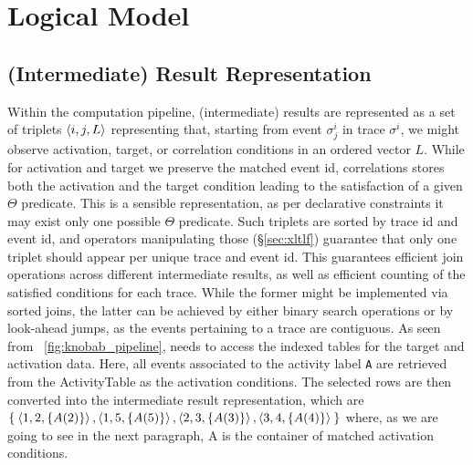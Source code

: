 \section{Logical Model}

\subsection{(Intermediate) Result Representation}
Within the computation pipeline, (intermediate) results are represented as a set of triplets $\braket{i,j,L}$ representing that, starting from event $\sigma^i_j$ in trace $\sigma^i$, we might observe activation, target, or correlation conditions in an ordered vector $L$.  While for activation and target %
we %
preserve 
the matched event id,
correlations stores
both the activation and the target condition leading to the satisfaction of a given $\Theta$ predicate. This is a sensible representation, as per declarative constraints it may exist only one possible $\Theta$ predicate. Such triplets are sorted by trace id and event id, and operators manipulating those (\S\ref{sec:xltlf}) guarantee that only one triplet should appear per unique trace and event id. This guarantees efficient join operations across different intermediate results, as well as efficient counting of the satisfied conditions for each trace. While the former might be implemented via sorted joins, the latter can be achieved by either binary search operations or by look-ahead jumps, as the events pertaining to a trace are contiguous. As seen from \figurename~\ref{fig:knobab_pipeline},  needs to access the indexed tables for the target and activation data. Here, all events associated to the activity label \texttt{A} are retrieved from the \textsf{ActivityTable} as the activation conditions. The selected rows are then converted into the intermediate result representation, which are $\Set{\braket{1,2,\{A(2)\}}, \braket{1,5,\{A(5)\}}, \braket{2,3,\{A(3)\}}, \braket{3,4,\{A(4)\}}}$ where, as we are going to see in the next paragraph, A is the container of matched activation conditions. 


